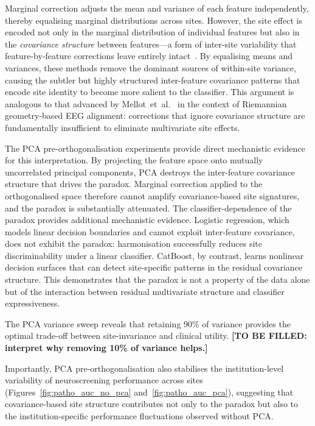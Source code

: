 \documentclass[preprint,12pt]{elsarticle}
\begin{document}
Marginal correction adjusts the mean and variance of each feature
independently, thereby equalising marginal distributions across
sites.
However, the site effect is encoded not only in the marginal
distribution of individual features but also in the
\emph{covariance structure} between features---a form of inter-site
variability that feature-by-feature corrections leave entirely
intact~\cite{hu2023image}.
By equalising means and variances, these methods remove the dominant
sources of within-site variance, causing the subtler but
highly structured inter-feature covariance patterns that encode site
identity to become more salient to the classifier.
This argument is analogous to that advanced by
Mellot~et~al.~\cite{mellot2023meeg} in the context of Riemannian
geometry-based EEG alignment: corrections that ignore covariance
structure are fundamentally insufficient to eliminate multivariate
site effects.

The PCA pre-orthogonalisation experiments provide direct mechanistic
evidence for this interpretation.
By projecting the feature space onto mutually uncorrelated principal
components, PCA destroys the inter-feature covariance structure that
drives the paradox.
Marginal correction applied to the orthogonalised space therefore
cannot amplify covariance-based site signatures, and the paradox is
substantially attenuated.
The classifier-dependence of the paradox provides additional
mechanistic evidence.
Logistic regression, which models linear decision boundaries and
cannot exploit inter-feature covariance, does not exhibit the
paradox: harmonisation successfully reduces site discriminability
under a linear classifier.
CatBoost, by contrast, learns nonlinear decision surfaces that can
detect site-specific patterns in the residual covariance structure.
This demonstrates that the paradox is not a property of the data
alone but of the interaction between residual multivariate structure
and classifier expressiveness.

The PCA variance sweep reveals that retaining 90\% of variance
provides the optimal trade-off between site-invariance and clinical
utility.
\textbf{[TO BE FILLED: interpret why removing 10\% of variance
helps.]}

Importantly, PCA pre-orthogonalisation also stabilises the
institution-level variability of neuroscreening performance across
sites (Figures~\ref{fig:patho_auc_no_pca}
and~\ref{fig:patho_auc_pca}), suggesting that covariance-based
site structure contributes not only to the paradox but also to the
institution-specific performance fluctuations observed without PCA.
\end{document}
